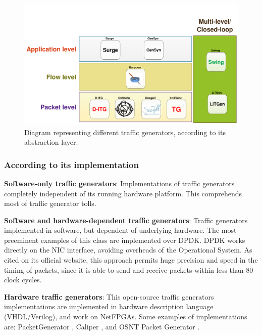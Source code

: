 \begin{figure}[!ht]
	\centering
	\includegraphics[scale=0.4]{figures/ch2/types-workload-tools}
	\caption{Diagram representing different traffic generators, according to its abstraction layer.}
	\label{fig:layers-workload-tools}
\end{figure}

\subsubsection{According to its implementation}

\textbf{Software-only traffic generators}: Implementations of traffic generators completely independent of its running hardware platform. This comprehends most of traffic generator tolls.

\textbf{Software and hardware-dependent traffic generators}: Traffic generators implemented in software, but dependent of underlying hardware. The most preeminent examples of this class are implemented over DPDK\cite{web-dpdk}. DPDK works directly on the NIC interface, avoiding overheads of the Operational System. As cited on its official website, this approach permits huge precision and speed in the timing of packets, since it is able to send and receive packets within less than 80 clock cycles.

\textbf{Hardware traffic generators}: This open-source traffic generators implementations are implemented in hardware description language (VHDL/Verilog), and work on NetFPGAs. Some examples of implementations are: PacketGenerator \cite{web-netfpgapacketgenerator}, Caliper \cite{web-caliper}, and OSNT Packet Generator \cite{web-osnt}.





\renewcommand{\tabularxcolumn}[1]{>{\small}m{#1}}



